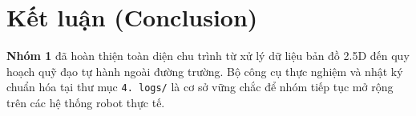 \documentclass[a4paper,12pt]{article}
\begin{document}
\section{Kết luận (Conclusion)}

\textbf{Nhóm 1} đã hoàn thiện toàn diện chu trình từ xử lý dữ liệu bản đồ 2.5D đến quy hoạch quỹ đạo tự hành ngoài đường trường. Bộ công cụ thực nghiệm và nhật ký chuẩn hóa tại thư mục \texttt{4. logs/} là cơ sở vững chắc để nhóm tiếp tục mở rộng trên các hệ thống robot thực tế.



\end{document}
